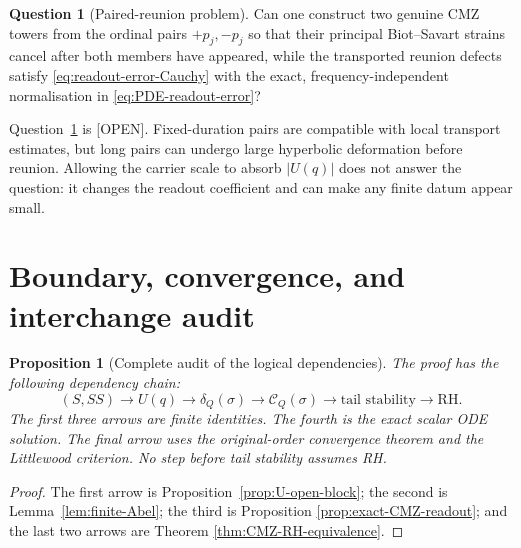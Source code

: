 \documentclass[11pt]{amsart}
\numberwithin{equation}{section}
\theoremstyle{plain}
\newtheorem{proposition}[theorem]{Proposition}
\theoremstyle{definition}
\newtheorem{question}[theorem]{Question}
\theoremstyle{remark}
\newcommand{\RH}{\mathrm{RH}}
\begin{document}
\begin{question}[Paired-reunion problem]
\label{q:paired-reunion}
Can one construct two genuine CMZ towers from the ordinal pairs
$+p_j,-p_j$ so that their principal Biot--Savart strains cancel after both
members have appeared, while the transported reunion defects satisfy
\eqref{eq:readout-error-Cauchy} with the exact, frequency-independent
normalisation in \eqref{eq:PDE-readout-error}?
\end{question}

Question~\ref{q:paired-reunion} is \textup{[OPEN]}.  Fixed-duration pairs are
compatible with local transport estimates, but long pairs can undergo large
hyperbolic deformation before reunion.  Allowing the carrier scale to absorb
$|U(q)|$ does not answer the question: it changes the readout coefficient and
can make any finite datum appear small.

\section{Boundary, convergence, and interchange audit}
\label{sec:audit}

\begin{proposition}[Complete audit of the logical dependencies]
\label{prop:dependency-audit}
The proof has the following dependency chain:
\begin{equation}
(S,SS)\longrightarrow U(q)
\longrightarrow\delta_Q(\sigma)
\longrightarrow\mathscr C_Q(\sigma)
\longrightarrow\text{tail stability}
\longrightarrow\RH.
\label{eq:dependency-chain}
\end{equation}
The first three arrows are finite identities.  The fourth is the exact scalar
ODE solution.  The final arrow uses the original-order convergence theorem
and the Littlewood criterion.  No step before tail stability assumes RH.
\end{proposition}

\begin{proof}
The first arrow is Proposition~\ref{prop:U-open-block}; the second is
Lemma~\ref{lem:finite-Abel}; the third is Proposition
\ref{prop:exact-CMZ-readout}; and the last two arrows are Theorem
\ref{thm:CMZ-RH-equivalence}.
\end{proof}
\end{document}

